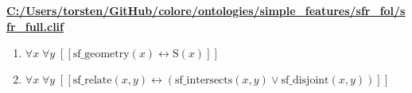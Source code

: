 \documentclass{article}
\begin{document}
\textbf{\url{C:/Users/torsten/GitHub/colore/ontologies/simple\_features/sfr\_fol/sfr\_full.clif}}

\begin{enumerate}
\item $\forall x\; \forall y\;  \left[ \left[ \textrm{sf\_geometry}(x) \leftrightarrow \textrm{S}(x) \right] \right]$
\item $\forall x\; \forall y\;  \left[ \left[ \textrm{sf\_relate}(x,y) \leftrightarrow \left(\textrm{sf\_intersects}(x,y) \lor \textrm{sf\_disjoint}(x,y)\right) \right] \right]$
\end{enumerate}
\end{document}
